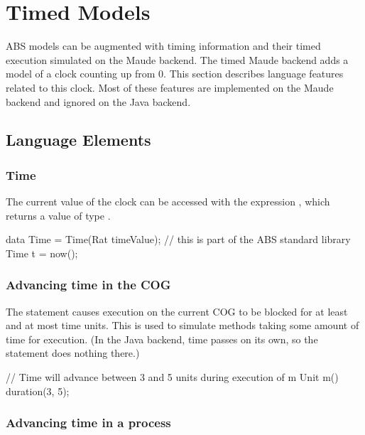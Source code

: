 \chapter{Timed Models}
\label{ch:timedmodels}

ABS models can be augmented with timing information and their timed execution simulated on the Maude backend.  The timed Maude backend adds a model of a clock counting up from 0.  This section describes language features related to this clock.  Most of these features are implemented on the Maude backend and ignored on the Java backend.

\section{Language Elements}

\subsection{Time}

The current value of the clock can be accessed with the expression , which returns a value of type .  

\begin{absexample} 
data Time = Time(Rat timeValue);  // this is part of the ABS standard library
Time t = now();
\end{absexample}

\subsection{Advancing time in the COG}

The  statement causes execution on the
current COG to be blocked for at least  and at most
 time units.  This is used to simulate methods taking some
amount of time for execution.  (In the Java backend, time passes on
its own, so the  statement does nothing there.)

\begin{absexample}
// Time will advance between 3 and 5 units during execution of m
Unit m() {
  duration(3, 5);
}
\end{absexample}

\subsection{Advancing time in a process}

